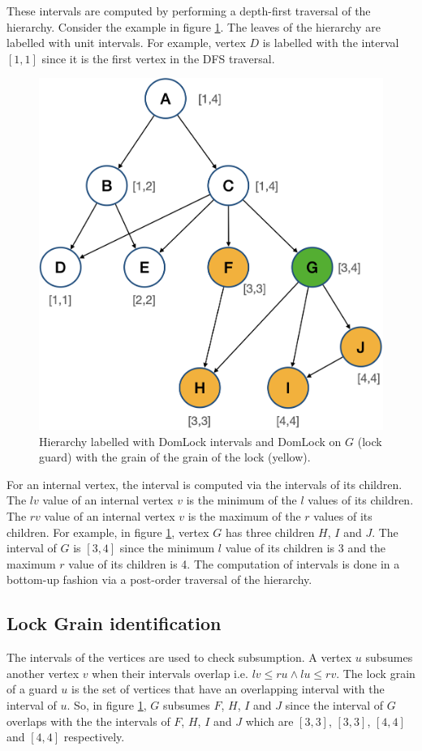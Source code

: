 These intervals are computed by performing a depth-first traversal of the hierarchy. Consider the example in figure \ref{fig:domlock_example_locked}. The leaves of the hierarchy are labelled with unit intervals. For example, vertex $D$ is labelled with the interval $[1, 1]$ since it is the first vertex in the DFS traversal. 
\begin{figure}
    \centering
    \captionsetup{justification=centering}
    \includegraphics[width=.5\textwidth]{figures/domlock_example_with_lock.png}
    \caption{Hierarchy labelled with DomLock intervals and DomLock on $G$ (lock guard) with the grain of the grain of the lock (yellow).}
    \label{fig:domlock_example_locked}
\end{figure}
For an internal vertex, the interval is computed via the intervals of its children. The $lv$ value of an internal vertex $v$ is the minimum of the $l$ values of its children. The $rv$ value of an internal vertex $v$ is the maximum of the $r$ values of its children. For example, in figure \ref{fig:domlock_example_locked}, vertex $G$ has three children $H$, $I$ and $J$. The interval of $G$ is $[3,4]$ since the minimum $l$ value of its children is 3 and the maximum $r$ value of its children is 4. The computation of intervals is done in a bottom-up fashion via a post-order traversal of the hierarchy. 

\subsection{Lock Grain identification}
The intervals of the vertices are used to check subsumption. A vertex $u$ subsumes another vertex $v$ when their intervals overlap i.e. $lv \leq ru \land lu \leq rv$. The lock grain of a guard $u$ is the set of vertices that have an overlapping interval with the interval of $u$. So, in figure \ref{fig:domlock_example_locked}, $G$ subsumes $F$, $H$, $I$ and $J$ since the interval of $G$ overlaps with the the intervals of $F$, $H$, $I$ and $J$ which are $[3,3]$, $[3,3]$, $[4,4]$ and $[4,4]$ respectively.

